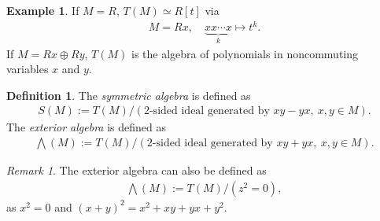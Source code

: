 \documentclass[12pt]{report}
\theoremstyle{plain}
\theoremstyle{remark}
\newtheorem*{remark}{Remark}
\theoremstyle{definition}
\newtheorem{definition}[theorem]{Definition}
\newtheorem{example}[theorem]{Example}
\begin{document}
\begin{example}
    If $M=R$, $T(M)\simeq R[t]$ via
    \begin{align*}
        M=Rx,\quad \underbrace{xx\cdots x}_k \mapsto t^k.
    \end{align*}
    If $M=Rx\oplus Ry$, $T(M)$ is the algebra of polynomials in noncommuting variables $x$ and $y$.
\end{example}

\begin{definition}
    The \emph{symmetric algebra} is defined as
    \begin{align*}
        S(M) := T(M)/(\text{2-sided ideal generated by }xy-yx,~x,y\in M).
    \end{align*}
    The \emph{exterior algebra} is defined as
    \begin{align*}
        \bigwedge(M) := T(M) / (\text{2-sided ideal generated by }xy+yx,~x,y\in M).
    \end{align*}
\end{definition}
\begin{remark}
    The exterior algebra can also be defined as
    \begin{align*}
        \bigwedge(M) := T(M) / (z^2=0),
    \end{align*}
    as $x^2=0$ and $(x+y)^2=x^2+xy+yx+y^2$.
\end{remark}
\end{document}
